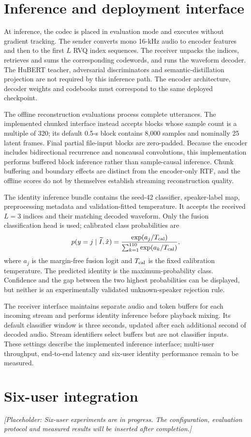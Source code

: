 \section{Inference and deployment interface}
At inference, the codec is placed in evaluation mode and executes without gradient tracking. The sender converts mono 16-kHz audio to encoder features and then to the first $L$ RVQ index sequences. The receiver unpacks the indices, retrieves and sums the corresponding codewords, and runs the waveform decoder. The HuBERT teacher, adversarial discriminators and semantic-distillation projection are not required by this inference path. The encoder architecture, decoder weights and codebooks must correspond to the same deployed checkpoint.

The offline reconstruction evaluations process complete utterances. The implemented chunked interface instead accepts blocks whose sample count is a multiple of 320; its default 0.5-s block contains 8,000 samples and nominally 25 latent frames. Final partial file-input blocks are zero-padded. Because the encoder includes bidirectional recurrence and noncausal convolutions, this implementation performs buffered block inference rather than sample-causal inference. Chunk buffering and boundary effects are distinct from the encoder-only RTF, and the offline scores do not by themselves establish streaming reconstruction quality.

The identity inference bundle contains the seed-42 classifier, speaker-label map, preprocessing metadata and validation-fitted temperature. It accepts the received $L=3$ indices and their matching decoded waveform. Only the fusion classification head is used; calibrated class probabilities are
\begin{equation}
 p(y=j\mid \widetilde I,\hat{x})
 =\frac{\exp(a_j/T_{\rm cal})}
 {\sum_{k=1}^{110}\exp(a_k/T_{\rm cal})},
\end{equation}
where $a_j$ is the margin-free fusion logit and $T_{\rm cal}$ is the fixed calibration temperature. The predicted identity is the maximum-probability class. Confidence and the gap between the two highest probabilities can be displayed, but neither is an experimentally validated unknown-speaker rejection rule.

The receiver interface maintains separate audio and token buffers for each incoming stream and performs identity inference before playback mixing. Its default classifier window is three seconds, updated after each additional second of decoded audio. Stream identifiers select buffers but are not classifier inputs. These settings describe the implemented inference interface; multi-user throughput, end-to-end latency and six-user identity performance remain to be measured.

\section{Six-user integration}
\noindent\textit{[Placeholder: Six-user experiments are in progress. The configuration, evaluation protocol and measured results will be inserted after completion.]}
